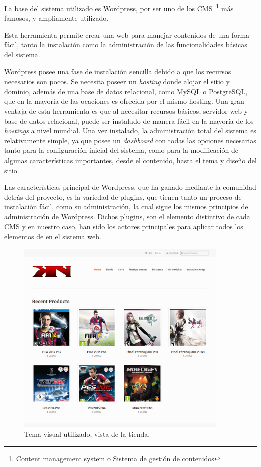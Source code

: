 La base del sistema utilizado es Wordpress, por ser uno de los
CMS~\footnote{Content management system o Sistema de gestión de contenidos}
más famosos, y ampliamente utilizado\cite{CmsPerformance}.

Esta herramienta permite crear una web para manejar contenidos de una forma fácil,
tanto la instalación como la administración de las funcionalidades básicas del sistema.

Wordpress posee una fase de instalación sencilla debido a que los recursos
necesarios son pocos. Se necesita poseer un \emph{hosting} donde alojar el sitio y
dominio, además de una base de datos relacional, como MySQL o PostgreSQL, que en la mayoria
de las ocaciones es ofrecida por el mismo hosting.
Una gran ventaja de esta herramienta es que al necesitar recursos básicos,
servidor web y base de datos relacional, puede ser instalado de manera fácil en la
mayoría de los \emph{hostings} a nivel mundial.
Una vez instalado, la administración total del sistema es relativamente simple,
ya que posee un \emph{dashboard} con todas las opciones necesarias
tanto para la configuración inicial del sistema, como para la modificación
de algunas características importantes, desde el contenido, hasta el tema
y diseño del sitio.

Las características principal de Wordpress, que ha ganado mediante
la comunidad detrás del proyecto, es la variedad de plugins, que
tienen tanto un proceso de instalación fácil, como su administración,
la cual sigue los mismos principios de administración de Wordpress.
Dichos plugins, son el elemento distintivo de cada CMS
y en nuestro caso, han sido los actores principales para aplicar
todos los elementos de {\GAM} en el sistema web.

\begin{figure}[!htb]
  \centering
  \includegraphics[width=0.9\textwidth]{images/Tienda/Tienda.png}
  \caption[TemaVisual]{Tema visual utilizado, vista de la tienda.}
  \label{fig:Players}
\end{figure}



